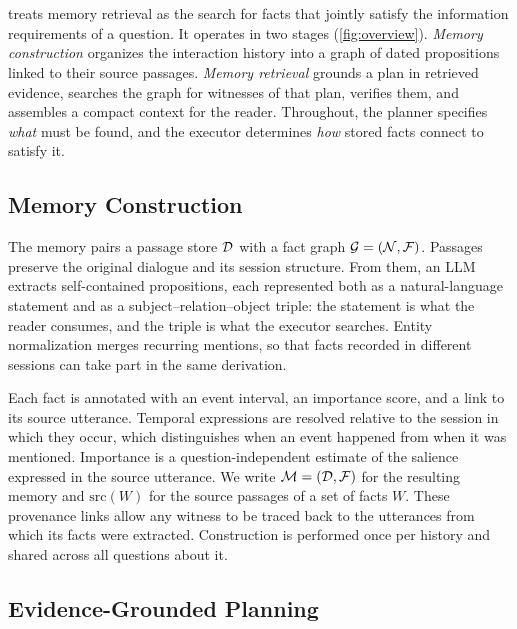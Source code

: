 \section{\texorpdfstring{\sys}{WitnessRAG}}
\label{sec:method}

\sys treats memory retrieval as the search for facts that jointly satisfy
the information requirements of a question. It operates in two stages
(\cref{fig:overview}). \emph{Memory construction} organizes the
interaction history into a graph of dated propositions linked to their
source passages. \emph{Memory retrieval} grounds a plan in retrieved
evidence, searches the graph for witnesses of that plan, verifies them,
and assembles a compact context for the reader. Throughout, the planner
specifies \emph{what} must be found, and the executor determines
\emph{how} stored facts connect to satisfy it.



\subsection{Memory Construction}
\label{sec:method-register}

The memory pairs a passage store $\mathcal{D}$ with a fact graph
$\mathcal G=(\mathcal N,\mathcal{F})$. Passages preserve the original dialogue
and its session structure. From them, an \ac{LLM} extracts
self-contained propositions, each represented both as a natural-language
statement and as a subject--relation--object triple: the statement is
what the reader consumes, and the triple is what the executor searches.
Entity normalization merges recurring mentions, so that facts recorded
in different sessions can take part in the same derivation.

Each fact is annotated with an event interval, an importance score, and a
link to its source utterance. Temporal expressions are resolved relative
to the session in which they occur, which distinguishes when an event
happened from when it was mentioned. Importance is a
question-independent estimate of the salience expressed in the source
utterance. We write $\mathcal{M}=(\mathcal{D},\mathcal{F})$ for the resulting memory
and $\mathrm{src}(W)$ for the source passages of a set of facts $W$.
These provenance links allow any witness to be traced back to the
utterances from which its facts were extracted. Construction is performed
once per history and shared across all questions about it.

\subsection{Evidence-Grounded Planning}
\label{sec:method-plan}

